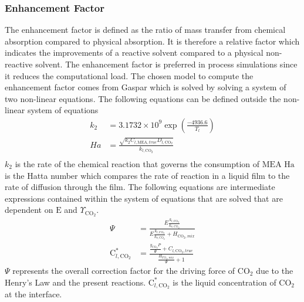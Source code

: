 \documentclass[12pt, letterpaper]{article}
\begin{document}
            \subsubsection{Enhancement Factor}
            
                The enhancement factor is defined as the ratio of mass transfer from chemical absorption compared to physical absorption.
                It is therefore a relative factor which indicates the improvements of a reactive solvent compared to a physical non-reactive solvent.
                The enhancement factor is preferred in process simulations since it reduces the computational load.
                The chosen model to compute the enhancement factor comes from Gaspar\cite{Gaspar2015ACase-study} which is solved by solving a system of two non-linear equations.
                The following equations can be defined outside the non-linear system of equations
                \begin{align}
                    k_2 &= 3.1732 \times 10^{9} \exp\left( \frac{-4936.6}{T_l}\right) \\
                    Ha &= \frac{\sqrt{k_2 C_{l,\mathrm{MEA},true} D_{l,\mathrm{CO}_2}}}{k_{l,\mathrm{CO}_2}} \\
                \end{align}
                $k_2$ is the rate of the chemical reaction that governs the consumption of $\mathrm{MEA}$
                $\mathrm{Ha}$ is the Hatta number which compares the rate of reaction in a liquid film to the rate of diffusion through the film.
                The following equations are intermediate expressions contained within the system of equations that are solved that are dependent on $\mathrm{E}$ and $\Upsilon _{\mathrm{CO}_2}.$
                \begin{align}
                    \Psi &= \frac{E \frac{k_{l, \mathrm{CO}_2}}{k_{v, \mathrm{CO}_2}}}{E \frac{k_{l, \mathrm{CO}_2}}{k_{v, \mathrm{CO}_2}} + H_{\mathrm{CO}_2, mix}} \\
                    \mathrm{C}_{l, \mathrm{CO}_2}^{*} &= \frac{\frac{y_{\mathrm{CO}_2}P}{\Psi} + C_{l, \mathrm{CO}_2, true}}{\frac{H_{\mathrm{CO}_2,mix}}{\Psi} + 1}
                \end{align}
                $\Psi$ represents the overall correction factor for the driving force of $\mathrm{CO_2}$ due to the Henry's Law and the present reactions.
                $\mathrm{C}_{l, \mathrm{CO}_2}^{*}$ is the liquid concentration of $\mathrm{CO_2}$ at the interface.
\end{document}
